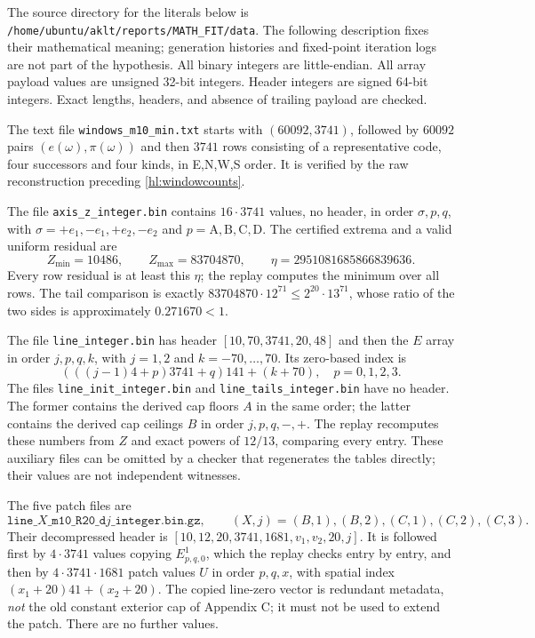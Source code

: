 The source directory for the literals below is
\texttt{/home/ubuntu/aklt/reports/MATH\_FIT/data}.
The following description fixes their mathematical meaning;
generation histories and fixed-point iteration logs are not
part of the hypothesis.  All binary integers are little-endian.
All array payload values are unsigned 32-bit integers.  Header
integers are signed 64-bit integers.  Exact lengths, headers,
and absence of trailing payload are checked.

The text file \texttt{windows\_m10\_min.txt} starts with
$(60092,3741)$, followed by $60092$ pairs $(e(\omega),\pi(\omega))$
and then $3741$ rows consisting of a representative code,
four successors and four kinds, in E,N,W,S order.
It is verified by the raw reconstruction preceding
\eqref{hl:windowcounts}.

The file \texttt{axis\_z\_integer.bin} contains $16\cdot3741$
values, no header, in order $\sigma,p,q$, with
$\sigma=+e_1,-e_1,+e_2,-e_2$ and $p=\mathrm A,\mathrm B,\mathrm C,\mathrm D$.
The certified extrema and a valid uniform residual are
\begin{equation}\label{hl:eta}
 Z_{\min}=10486,\qquad Z_{\max}=83704870,\qquad
 \eta=2951081685866839636.
\end{equation}
Every row residual is at least this $\eta$; the replay computes
the minimum over all rows.  The tail comparison is exactly
$83704870\cdot12^{71}\le2^{20}\cdot13^{71}$, whose ratio
of the two sides is approximately $0.271670<1$.

The file \texttt{line\_integer.bin} has header
$[10,70,3741,20,48]$ and then the $E$ array in order
$j,p,q,k$, with $j=1,2$ and $k=-70,\ldots,70$.
Its zero-based index is
\[
 (((j-1)4+p)3741+q)141+(k+70),\quad p=0,1,2,3.
\]
The files \texttt{line\_init\_integer.bin} and
\texttt{line\_tails\_integer.bin} have no header.  The former
contains the derived cap floors $A$ in the same order; the
latter contains the derived cap ceilings $B$ in order
$j,p,q,-,+$.  The replay recomputes these numbers from $Z$
and exact powers of $12/13$, comparing every entry.  These
auxiliary files can be omitted by a checker that regenerates
the tables directly; their values are not independent witnesses.

The five patch files are
\[
 \texttt{line\_}X\texttt{\_m10\_R20\_d}j\texttt{\_integer.bin.gz},
 \qquad (X,j)=(B,1),(B,2),(C,1),(C,2),(C,3).
\]
Their decompressed header is
$[10,12,20,3741,1681,v_1,v_2,20,j]$.
It is followed first by $4\cdot3741$ values copying
$E^1_{p,q,0}$, which the replay checks entry by entry, and
then by $4\cdot3741\cdot1681$ patch values $U$ in order
$p,q,x$, with spatial index $(x_1+20)41+(x_2+20)$.
The copied line-zero vector is redundant metadata, \emph{not}
the old constant exterior cap of Appendix C; it must not be
used to extend the patch.  There are no further values.

